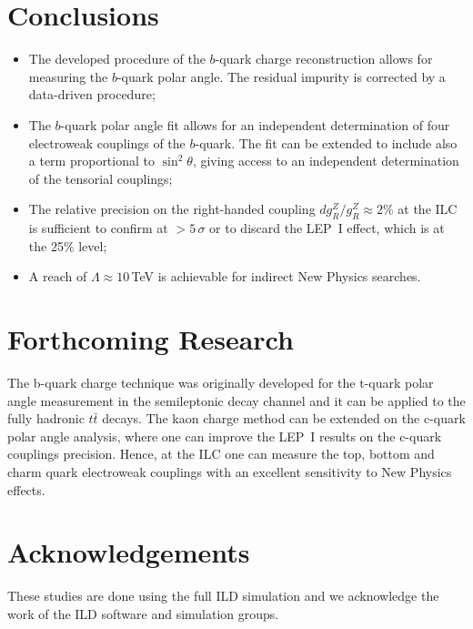 \documentclass{PoS}
\begin{document}

\section*{Conclusions}

\begin{itemize}
	\item The developed procedure of the $b$-quark charge reconstruction allows for measuring the $b$-quark polar angle. The residual impurity is corrected by a data-driven procedure;
	\item The $b$-quark polar angle fit allows for an independent determination of four electroweak couplings of the $b$-quark. The fit can be extended to include also a term proportional to $\sin^2\theta$, giving access to an independent determination of the tensorial couplings;
	\item  The relative precision on the right-handed coupling $dg^Z_R/g^Z_R\approx 2$\% at the ILC is sufficient to confirm at $>5\,\sigma$ or to discard the LEP~I effect, which is at the 25\% level;
	\item A reach of $\Lambda \approx 10$\,TeV is achievable for indirect New Physics searches.
\end{itemize}


\section*{Forthcoming Research}
The b-quark charge technique was originally developed for the t-quark polar angle measurement in the semileptonic decay channel and it can be applied to the fully hadronic $t\bar{t}$ decays.
The kaon charge method can be extended on the c-quark polar angle analysis, where one can improve the LEP~I results on the c-quark couplings precision. 
Hence, at the ILC one can measure the top, bottom and charm quark electroweak couplings with an excellent sensitivity to New Physics effects.

\section*{Acknowledgements}

These studies are done using the full ILD simulation and we acknowledge the work of the ILD software and simulation groups.



 
%
\end{document}
